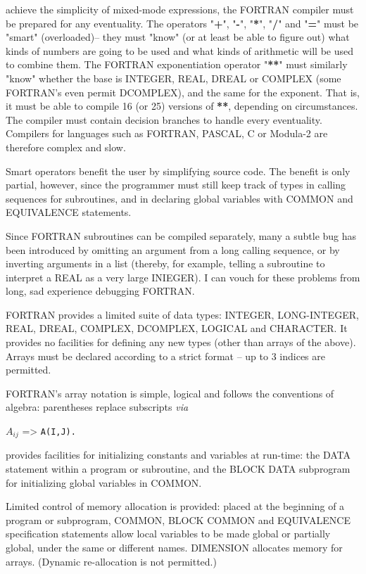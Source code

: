  achieve the simplicity of mixed-mode expressions, the FORTRAN compiler must be prepared for any eventuality. The operators "\textbf{+}", "\textbf{-}", "\textbf{*}", "\textbf{/}" and "\textbf{=}" must be "smart" (overloaded)-- they must "know" (or at least be able to figure out) what kinds of numbers are going to be used and what kinds of arithmetic will be used to combine them. The FORTRAN exponentiation operator "\textbf{**}" must similarly "know" whether the base is INTEGER, REAL, DREAL or COMPLEX (some FORTRAN's even permit DCOMPLEX), and the same for the exponent. That is, it must be able to compile 16 (or 25) versions of \textbf{**}, depending on circumstances. The compiler must contain decision branches to handle every eventuality. Compilers for languages such as FORTRAN, PASCAL, C or Modula-2 are therefore complex and slow.

Smart operators benefit the user by simplifying source code. The benefit is only partial, however, since the programmer must still keep track of types in calling sequences for subroutines, and in declaring global variables with COMMON and EQUIVALENCE statements.
 
Since FORTRAN subroutines can be compiled separately, many a subtle bug has been introduced by omitting an argument from a long calling sequence, or by inverting arguments in a list (thereby, for example, telling a subroutine to interpret a REAL as a very large INIEGER). I can vouch for these problems from long, sad experience debugging FORTRAN.

FORTRAN provides a limited suite of data types: INTEGER, LONG-INTEGER, REAL, DREAL, COMPLEX, DCOMPLEX, LOGICAL and CHARACTER. It provides no facilities for defining any new types (other than arrays of the above). Arrays must be declared according to a strict format -- up to 3 indices are permitted.

FORTRAN's array notation is simple, logical and follows the conventions of algebra: parentheses replace subscripts \textit{via}


\quad $A_{ij}$ => \verb|A(I,J).|


 provides facilities for initializing constants and variables at run-time: the DATA statement within a program or subroutine, and the BLOCK DATA subprogram for initializing global variables in COMMON.

Limited control of memory allocation is provided: placed at the beginning of a program or subprogram, COMMON, BLOCK COMMON and EQUIVALENCE specification statements allow local variables to be made global or partially global, under the same or different names. DIMENSION allocates memory for arrays. (Dynamic re-allocation is not permitted.)

